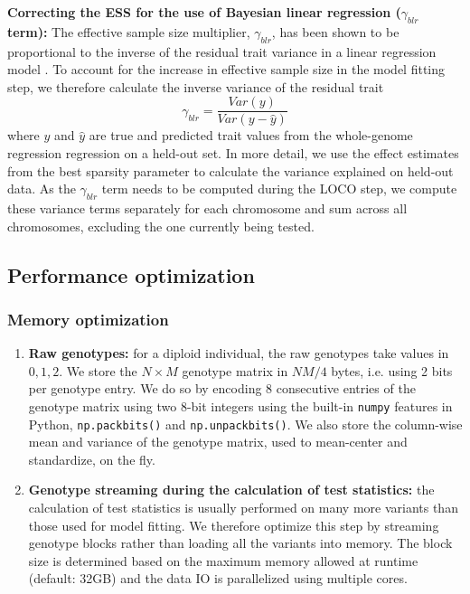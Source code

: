 %
\noindent \textbf{Correcting the ESS for the use of Bayesian linear regression ($\gamma_{blr}$ term):}
%
The effective sample size multiplier, $\gamma_{blr}$, has been shown to be proportional to the inverse of the residual trait variance in a linear regression model \cite{loh2015efficient, ziyatdinov2021estimating}.
%
To account for the increase in effective sample size in the model fitting step, we therefore calculate the inverse variance of the residual trait 
\begin{equation}
    \gamma_{blr} = \frac{Var(y)}{Var(y-\hat{y})}
\end{equation}
where $y$ and $\hat{y}$ are true and predicted trait values from the whole-genome regression regression on a held-out set.
%
In more detail, we use the effect estimates from the best sparsity parameter to calculate the variance explained on held-out data.
%
As the $\gamma_{blr}$ term needs to be computed during the LOCO step, we compute these variance terms separately for each chromosome and sum across all chromosomes, excluding the one currently being tested.
%


\subsection{Performance optimization}
\subsubsection{Memory optimization}
\begin{enumerate}
    \item \textbf{Raw genotypes:}
    for a diploid individual, the raw genotypes take values in ${0,1,2}$.
    We store the $N \times M$ genotype matrix in $NM/4$ bytes, i.e. using 2 bits per genotype entry.
    We do so by encoding 8 consecutive entries of the genotype matrix using two 8-bit integers using the built-in \texttt{numpy} features in Python, \texttt{np.packbits()} and \texttt{np.unpackbits()}.
    We also store the column-wise mean and variance of the genotype matrix, used to mean-center and standardize, on the fly.
    
    \item \textbf{Genotype streaming during the calculation of test statistics:}
    the calculation of test statistics is usually performed on many more variants than those used for model fitting.
    We therefore optimize this step by streaming genotype blocks rather than loading all the variants into memory.
    The block size is determined based on the maximum memory allowed at runtime (default: 32GB) and the data IO is parallelized using multiple cores.
    
\end{enumerate}

